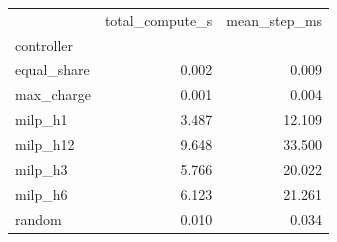 \begin{tabular}{lrr}
\toprule
 & total_compute_s & mean_step_ms \\
controller &  &  \\
\midrule
equal_share & 0.002 & 0.009 \\
max_charge & 0.001 & 0.004 \\
milp_h1 & 3.487 & 12.109 \\
milp_h12 & 9.648 & 33.500 \\
milp_h3 & 5.766 & 20.022 \\
milp_h6 & 6.123 & 21.261 \\
random & 0.010 & 0.034 \\
\bottomrule
\end{tabular}
